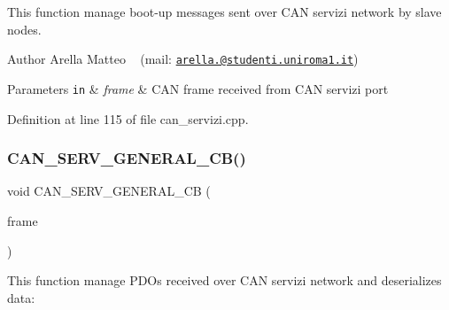 This function manage boot-\/up messages sent over C\+AN servizi network by slave nodes. 

\begin{DoxyAuthor}{Author}
Arella Matteo ~\newline
 (mail\+: \href{mailto:arella.1646983@studenti.uniroma1.it}{\tt arella.@studenti.\+uniroma1.\+it})
\end{DoxyAuthor}

\begin{DoxyParams}[1]{Parameters}
\mbox{\tt in}  & {\em frame} & C\+AN frame received from C\+AN servizi port \\
\hline
\end{DoxyParams}


Definition at line 115 of file can\+\_\+servizi.\+cpp.

\mbox{\label{group___c_a_n__servizi__group_ga5897a28288e24aa5131ff5b81f5fedc8}} 
\subsubsection{\texorpdfstring{C\+A\+N\+\_\+\+S\+E\+R\+V\+\_\+\+G\+E\+N\+E\+R\+A\+L\+\_\+\+C\+B()}{CAN\_SERV\_GENERAL\_CB()}}
{\footnotesize\ttfamily void C\+A\+N\+\_\+\+S\+E\+R\+V\+\_\+\+G\+E\+N\+E\+R\+A\+L\+\_\+\+CB (\begin{DoxyParamCaption}\item[{C\+A\+N\+\_\+\+F\+R\+A\+ME $\ast$}]{frame }\end{DoxyParamCaption})}



This function manage P\+D\+Os received over C\+AN servizi network and deserializes data\+: 

